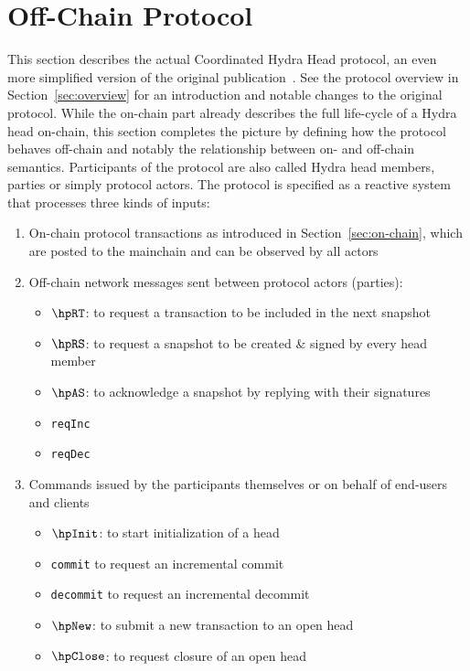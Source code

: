 \section{Off-Chain Protocol}\label{sec:offchain}

This section describes the actual Coordinated Hydra Head protocol, an even more
simplified version of the original publication~\cite{hydrahead20}. See the
protocol overview in Section~\ref{sec:overview} for an introduction and notable
changes to the original protocol. While the on-chain part already describes the
full life-cycle of a Hydra head on-chain, this section completes the picture by
defining how the protocol behaves off-chain and notably the relationship between
on- and off-chain semantics. Participants of the protocol are also called Hydra
head members, parties or simply protocol actors. The protocol is specified as a
reactive system that processes three kinds of inputs:
\begin{enumerate}
	\item On-chain protocol transactions as introduced in
	      Section~\ref{sec:on-chain}, which are posted to the mainchain and can be
	      observed by all actors
	\item Off-chain network messages sent between protocol actors (parties):
	      \begin{itemize}
		      \item $\hpRT$: to request a transaction to be included in the next snapshot
		      \item $\hpRS$: to request a snapshot to be created \& signed by every head member
		      \item $\hpAS$: to acknowledge a snapshot by replying with their signatures
					\item \texttt{reqInc} 
					\item \texttt{reqDec} 
	      \end{itemize}
	\item Commands issued by the participants themselves or on behalf of end-users and clients
	      \begin{itemize}
		      \item $\hpInit$: to start initialization of a head
		      \item \texttt{commit} to request an incremental commit
		      \item \texttt{decommit} to request an incremental decommit
		      \item $\hpNew$: to submit a new transaction to an open head
		      \item $\hpClose$: to request closure of an open head
	      \end{itemize}
\end{enumerate}

